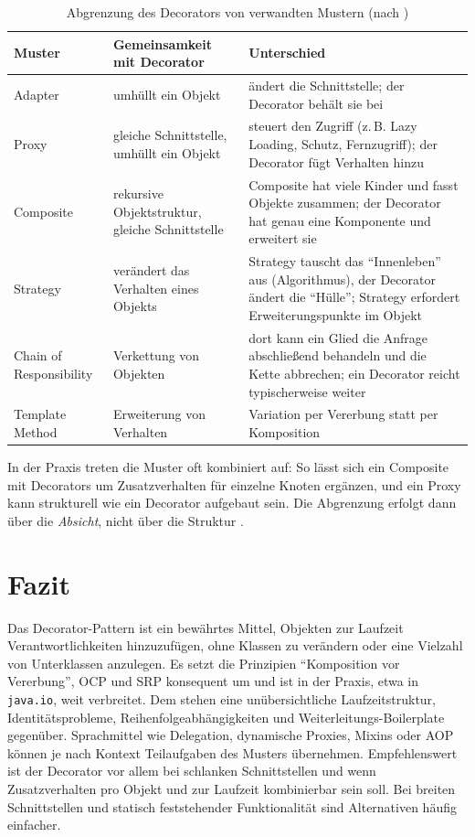 \documentclass[a4paper,11pt,toc=listof,toc=bibliography]{scrartcl}
\begin{document}
\begin{table}[H]
  \centering
  \caption{Abgrenzung des Decorators von verwandten Mustern (nach \cite{GHJV94})}
  \label{tab:abgrenzung}
  \small
  \begin{tabularx}{\textwidth}{@{}l X X@{}}
    \toprule
    \textbf{Muster} & \textbf{Gemeinsamkeit mit Decorator} & \textbf{Unterschied} \\
    \midrule
    Adapter & umhüllt ein Objekt & ändert die Schnittstelle; der Decorator behält sie bei \\
    Proxy & gleiche Schnittstelle, umhüllt ein Objekt & steuert den Zugriff (z.\,B. Lazy Loading, Schutz, Fernzugriff); der Decorator fügt Verhalten hinzu \\
    Composite & rekursive Objektstruktur, gleiche Schnittstelle & Composite hat viele Kinder und fasst Objekte zusammen; der Decorator hat genau eine Komponente und erweitert sie \\
    Strategy & verändert das Verhalten eines Objekts & Strategy tauscht das \enquote{Innenleben} aus (Algorithmus), der Decorator ändert die \enquote{Hülle}; Strategy erfordert Erweiterungspunkte im Objekt \\
    Chain of Responsibility & Verkettung von Objekten & dort kann ein Glied die Anfrage abschließend behandeln und die Kette abbrechen; ein Decorator reicht typischerweise weiter \\
    Template Method & Erweiterung von Verhalten & Variation per Vererbung statt per Komposition \\
    \bottomrule
  \end{tabularx}
\end{table}

In der Praxis treten die Muster oft kombiniert auf: So lässt sich ein Composite mit Decorators um Zusatzverhalten für einzelne Knoten ergänzen, und ein Proxy kann strukturell wie ein Decorator aufgebaut sein. Die Abgrenzung erfolgt dann über die \emph{Absicht}, nicht über die Struktur \cite{GHJV94}.

\section{Fazit}
\label{sec:fazit}

Das Decorator-Pattern ist ein bewährtes Mittel, Objekten zur Laufzeit Verantwortlichkeiten hinzuzufügen, ohne Klassen zu verändern oder eine Vielzahl von Unterklassen anzulegen. Es setzt die Prinzipien \enquote{Komposition vor Vererbung}, \acs{OCP} und \acs{SRP} konsequent um und ist in der Praxis, etwa in \texttt{java.io}, weit verbreitet. Dem stehen eine unübersichtliche Laufzeitstruktur, Identitätsprobleme, Reihenfolgeabhängigkeiten und Weiterleitungs-Boilerplate gegenüber. Sprachmittel wie Delegation, dynamische Proxies, Mixins oder \acs{AOP} können je nach Kontext Teilaufgaben des Musters übernehmen. Empfehlenswert ist der Decorator vor allem bei schlanken Schnittstellen und wenn Zusatzverhalten pro Objekt und zur Laufzeit kombinierbar sein soll. Bei breiten Schnittstellen und statisch feststehender Funktionalität sind Alternativen häufig einfacher.
\end{document}
